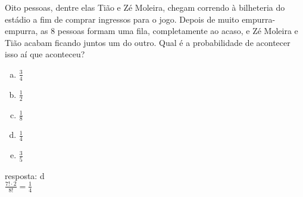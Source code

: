 \begin{ex}
 Oito pessoas, dentre elas Tião e Zé Moleira, chegam correndo à bilheteria do estádio a fim de comprar ingressos para o jogo. Depois de muito empurra-empurra, as 8 pessoas formam uma fila, completamente ao acaso, e Zé Moleira e Tião acabam  ficando juntos um do outro. Qual é a probabilidade de acontecer isso aí que aconteceu?
    \begin{enumerate}[(a)]
    \item $\frac{3}{4}$
    \item $\frac{1}{2}$
    \item $\frac{1}{8}$
    \item $\frac{1}{4}$
    \item $\frac{3}{5}$
    \end{enumerate}
      \begin{sol}
        resposta: d \\
        $\frac{7!\cdot2}{8!}=\frac{1}{4}$
      \end{sol}
\end{ex}